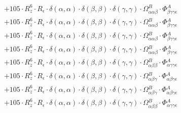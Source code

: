 \documentclass{article}
\begin{document}
\begin{subequations}
\begin{gather}
\begin{array}{c}
 \\[0.2em] 		 + 105 \cdot R_{z}^{6} \cdot R_{\epsilon{}} \cdot \delta{}\left(\alpha{}, \alpha{}\right) \cdot \delta{}\left(\beta{}, \beta{}\right) \cdot \delta{}\left(\gamma{}, \gamma{}\right) \cdot \Omega{}^{B}_{\alpha{}\alpha{}\beta{}} \cdot \Phi{}^{A}_{\beta{}\gamma{}\gamma{}\epsilon{}} 
 \\[0.2em] 		 + 105 \cdot R_{z}^{6} \cdot R_{\epsilon{}} \cdot \delta{}\left(\alpha{}, \alpha{}\right) \cdot \delta{}\left(\beta{}, \beta{}\right) \cdot \delta{}\left(\gamma{}, \gamma{}\right) \cdot \Omega{}^{B}_{\alpha{}\alpha{}\beta{}} \cdot \Phi{}^{A}_{\beta{}\gamma{}\gamma{}\epsilon{}} 
 \\[0.2em] 		 + 105 \cdot R_{z}^{6} \cdot R_{\epsilon{}} \cdot \delta{}\left(\alpha{}, \alpha{}\right) \cdot \delta{}\left(\beta{}, \beta{}\right) \cdot \delta{}\left(\gamma{}, \gamma{}\right) \cdot \Omega{}^{B}_{\alpha{}\alpha{}\beta{}} \cdot \Phi{}^{A}_{\beta{}\gamma{}\gamma{}\epsilon{}} 
 \\[0.2em] 		 + 105 \cdot R_{z}^{6} \cdot R_{\epsilon{}} \cdot \delta{}\left(\alpha{}, \alpha{}\right) \cdot \delta{}\left(\beta{}, \beta{}\right) \cdot \delta{}\left(\gamma{}, \gamma{}\right) \cdot \Omega{}^{B}_{\alpha{}\alpha{}\beta{}} \cdot \Phi{}^{A}_{\beta{}\gamma{}\gamma{}\epsilon{}} 
 \\[0.2em] 		 + 105 \cdot R_{z}^{6} \cdot R_{\epsilon{}} \cdot \delta{}\left(\alpha{}, \alpha{}\right) \cdot \delta{}\left(\beta{}, \beta{}\right) \cdot \delta{}\left(\gamma{}, \gamma{}\right) \cdot \Omega{}^{B}_{\alpha{}\beta{}\beta{}} \cdot \Phi{}^{A}_{\alpha{}\gamma{}\gamma{}\epsilon{}} 
 \\[0.2em] 		 + 105 \cdot R_{z}^{6} \cdot R_{\epsilon{}} \cdot \delta{}\left(\alpha{}, \alpha{}\right) \cdot \delta{}\left(\beta{}, \beta{}\right) \cdot \delta{}\left(\gamma{}, \gamma{}\right) \cdot \Omega{}^{B}_{\alpha{}\beta{}\gamma{}} \cdot \Phi{}^{A}_{\alpha{}\beta{}\gamma{}\epsilon{}} 
 \\[0.2em] 		 + 105 \cdot R_{z}^{6} \cdot R_{\epsilon{}} \cdot \delta{}\left(\alpha{}, \alpha{}\right) \cdot \delta{}\left(\beta{}, \beta{}\right) \cdot \delta{}\left(\gamma{}, \gamma{}\right) \cdot \Omega{}^{B}_{\alpha{}\beta{}\gamma{}} \cdot \Phi{}^{A}_{\alpha{}\beta{}\gamma{}\epsilon{}} 
 \\[0.2em] 		 + 105 \cdot R_{z}^{6} \cdot R_{\epsilon{}} \cdot \delta{}\left(\alpha{}, \alpha{}\right) \cdot \delta{}\left(\beta{}, \beta{}\right) \cdot \delta{}\left(\gamma{}, \gamma{}\right) \cdot \Omega{}^{B}_{\alpha{}\beta{}\beta{}} \cdot \Phi{}^{A}_{\alpha{}\gamma{}\gamma{}\epsilon{}} 

\end{array}
\end{gather}
\end{subequations}
\end{document}
